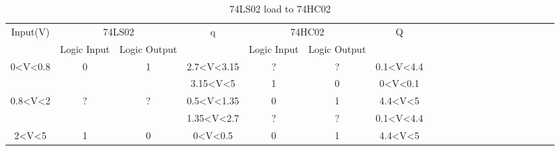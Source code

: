 	\begin{center}
	\begin{table}[h!]
	\begin{tabular}{llllllllllllllllllll}
	\cline{1-7}
	\multicolumn{1}{|c|}{\multirow{2}{*}{Input(V)}} & \multicolumn{2}{c|}{74LS02} & \multicolumn{1}{c|}{\multirow{2}{*}{q}} & \multicolumn{2}{c|}{74HC02} & \multicolumn{1}{c|}{\multirow{2}{*}{Q}}  \\ \cline{2-3} \cline{5-6}
	\multicolumn{1}{|c|}{} & \multicolumn{1}{c|}{Logic Input} & \multicolumn{1}{c|}{Logic Output} & \multicolumn{1}{c|}{} & \multicolumn{1}{c|}{Logic Input} & \multicolumn{1}{c|}{Logic Output} & \multicolumn{1}{c|}{}  \\ \cline{1-7}
	\multicolumn{1}{|c|}{\multirow{2}{*}{0\textless{}V\textless{}0.8}} & \multicolumn{1}{c|}{\multirow{2}{*}{0}} & \multicolumn{1}{c|}{\multirow{2}{*}{1}} & \multicolumn{1}{c|}{2.7\textless{}V\textless{}3.15} & \multicolumn{1}{c|}{?} & \multicolumn{1}{c|}{?} & \multicolumn{1}{c|}{0.1\textless{}V\textless{}4.4}  \\ \cline{4-7}
	\multicolumn{1}{|c|}{} & \multicolumn{1}{c|}{} & \multicolumn{1}{c|}{} & \multicolumn{1}{c|}{3.15\textless{}V\textless{}5} & \multicolumn{1}{c|}{1} & \multicolumn{1}{c|}{0} & \multicolumn{1}{c|}{0\textless{}V\textless{}0.1}  \\ \cline{1-7}
	\multicolumn{1}{|c|}{\multirow{2}{*}{0.8\textless{}V\textless{}2}} & \multicolumn{1}{c|}{\multirow{2}{*}{?}} & \multicolumn{1}{c|}{\multirow{2}{*}{?}} & \multicolumn{1}{c|}{0.5\textless{}V\textless{}1.35} & \multicolumn{1}{c|}{0} & \multicolumn{1}{c|}{1} & \multicolumn{1}{c|}{4.4\textless{}V\textless{}5}  \\ \cline{4-7}
	\multicolumn{1}{|c|}{} & \multicolumn{1}{c|}{} & \multicolumn{1}{c|}{} & \multicolumn{1}{c|}{1.35\textless{}V\textless{}2.7} & \multicolumn{1}{c|}{?} & \multicolumn{1}{c|}{?} & \multicolumn{1}{c|}{0.1\textless{}V\textless{}4.4}  \\ \cline{1-7}
	\multicolumn{1}{|c|}{2\textless{}V\textless{}5} & \multicolumn{1}{c|}{1} & \multicolumn{1}{c|}{0} & \multicolumn{1}{c|}{0\textless{}V\textless{}0.5} & \multicolumn{1}{c|}{0} & \multicolumn{1}{c|}{1} & \multicolumn{1}{c|}{4.4\textless{}V\textless{}5}\\ \cline{1-7}
	\end{tabular}
	\caption{\color{cyan}74LS02 load to 74HC02}
	\label{fig:ej2thlstohc}
	\end{table}
	\end{center}
	
